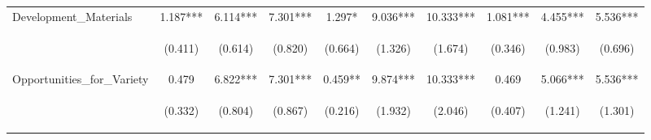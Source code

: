 \begin{tabular}{lccccccccc}
\noalign{\smallskip}Development_Materials & 1.187*** & 6.114*** & 7.301*** & 1.297* & 9.036*** & 10.333*** & 1.081*** & 4.455*** & 5.536***\\
 & \begin{footnotesize}(0.411)\end{footnotesize} & \begin{footnotesize}(0.614)\end{footnotesize} & \begin{footnotesize}(0.820)\end{footnotesize} & \begin{footnotesize}(0.664)\end{footnotesize} & \begin{footnotesize}(1.326)\end{footnotesize} & \begin{footnotesize}(1.674)\end{footnotesize} & \begin{footnotesize}(0.346)\end{footnotesize} & \begin{footnotesize}(0.983)\end{footnotesize} & \begin{footnotesize}(0.696)\end{footnotesize}\\
\noalign{\smallskip}Opportunities_for_Variety & 0.479 & 6.822*** & 7.301*** & 0.459** & 9.874*** & 10.333*** & 0.469 & 5.066*** & 5.536***\\
 & \begin{footnotesize}(0.332)\end{footnotesize} & \begin{footnotesize}(0.804)\end{footnotesize} & \begin{footnotesize}(0.867)\end{footnotesize} & \begin{footnotesize}(0.216)\end{footnotesize} & \begin{footnotesize}(1.932)\end{footnotesize} & \begin{footnotesize}(2.046)\end{footnotesize} & \begin{footnotesize}(0.407)\end{footnotesize} & \begin{footnotesize}(1.241)\end{footnotesize} & \begin{footnotesize}(1.301)\end{footnotesize}\\

\end{tabular}
